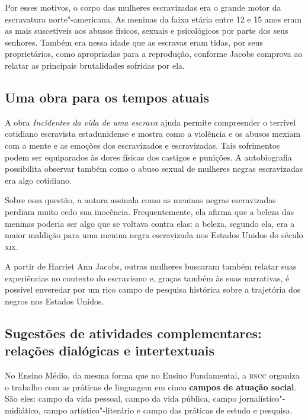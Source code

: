 \documentclass[11pt]{extarticle}
\begin{document}
Por esses motivos, o corpo das mulheres escravizadas era o grande motor
da escravatura norte"-americana. As meninas da faixa etária entre 12 e 15
anos eram as mais suscetíveis aos abusos físicos, sexuais e psicológicos
por parte dos seus senhores. Também era nessa idade que as escravas eram
tidas, por seus proprietários, como apropriadas para a reprodução,
conforme Jacobs comprova ao relatar as principais brutalidades sofridas
por ela.




\subsection{Uma obra para os tempos atuais}

A obra \emph{Incidentes da vida de uma escrava} ajuda permite
compreender o terrível cotidiano escravista estadunidense e mostra como
a violência e os abusos mexiam com a mente e as emoções dos escravizados
e escravizadas. Tais sofrimentos podem ser equiparados às dores físicas
dos castigos e punições. A autobiografia possibilita observar também
como o abuso sexual de mulheres negras escravizadas era algo cotidiano.

Sobre essa questão, a autora assinala como as meninas negras
escravizadas perdiam muito cedo sua inocência. Frequentemente, ela
afirma que a beleza das meninas poderia ser algo que se voltava contra
elas: a beleza, segundo ela, era a maior maldição para uma menina negra
escravizada nos Estados Unidos do século \textsc{xix}.

A partir de Harriet Ann Jacobs, outras mulheres buscaram também relatar
suas experiências no contexto do escravismo e, graças também às suas
narrativas, é possível enveredar por um rico campo de pesquisa histórica
sobre a trajetória dos negros nos Estados Unidos.

\subsection{Sugestões de atividades complementares: relações dialógicas e
intertextuais}


No Ensino Médio, da mesma forma que no Ensino Fundamental, a \textsc{bncc}
organiza o trabalho com as práticas de linguagem em cinco \textbf{campos
de atuação social}. São eles: campo da vida pessoal, campo da vida
pública, campo jornalístico"-midiático, campo artístico"-literário e campo
das práticas de estudo e pesquisa.
\end{document}

